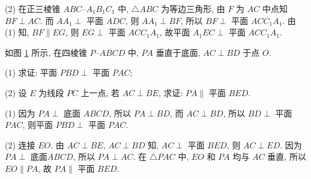    (2) 在正三棱锥 $ABC\text{--}A_1B_1C_1$ 中, 
    $\triangle ABC$ 为等边三角形, 由 $F$ 为 $AC$ 中点知 $BF\perp AC$. 而 $AA_1\perp$ 平面 $ADC$, 则 $AA_1\perp BF$, 所以 $BF\perp$ 平面 $ACC_1A_1$. 由 (1) 知, $BF\parallel EG$, 则 $EG\perp$ 平面 $ACC_1A_1$, 故平面 $A_1 EC\perp$ 平面 $ACC_1 A_1$.
\endsolution

\begin{exercise}
    如图 \ref{fig-190705-1910} 所示, 在四棱锥 $P\text{--}ABCD$ 中, $PA$ 垂直于底面, $AC\perp BD$ 于点 $O$.
    
    (1) 求证: 平面 $PBD\perp$ 平面 $PAC$;
    
    (2) 设 $E$ 为线段 $PC$ 上一点, 若 $AC\perp BE$, 求证: $PA\parallel$ 平面 $BED$.
\end{exercise}

    \begin{figure}[htb]
    \small
    \centering
      \caption{}\label{fig-190705-1910}
    \end{figure}

\beginsolution
    (1) 因为 $PA\perp$ 底面 $ABCD$, 所以 $PA\perp BD$, 而 $AC\perp BD$, 所以 $BD\perp$ 平面 $PAC$, 则平面 $PBD\perp$ 平面 $PAC$.

    (2) 连接 $EO$. 由 $AC\perp BE$, $AC\perp BD$ 知, $AC\perp$ 平面 $BED$, 则 $AC\perp ED$. 因为 $PA\perp$ 底面$ABCD$, 所以 $PA\perp AC$. 在 $\triangle PAC$ 中, $EO$ 和 $PA$ 均与 $AC$ 垂直, 所以 $EO\parallel PA$, 故 $PA\parallel$ 平面 $BED$.
\endsolution
